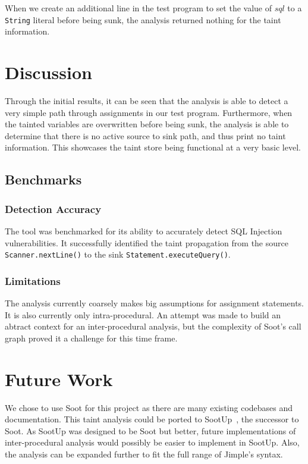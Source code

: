 \documentclass[acmsmall]{acmart}
\begin{document}
When we create an additional line in the test program to set the value of $sql$ to a \texttt{String} literal before being sunk, the analysis returned nothing for the taint information.
\section{Discussion}
Through the initial results, it can be seen that the analysis is able to detect a very simple path through assignments in our test program. Furthermore, when the tainted variables are overwritten before being sunk, the analysis is able to determine that there is no active source to sink path, and thus print no taint information. This showcases the taint store being functional at a very basic level.

\subsection{Benchmarks}
\subsubsection{Detection Accuracy} The tool was benchmarked for its ability to accurately detect SQL Injection vulnerabilities. It successfully identified the taint propagation from the source \texttt{Scanner.nextLine()} to the sink \texttt{Statement.executeQuery()}.

\subsubsection{Limitations}
The analysis currently coarsely makes big assumptions for assignment statements. It is also currently only intra-procedural. An attempt was made to build an abtract context for an inter-procedural analysis, but the complexity of Soot's call graph proved it a challenge for this time frame.

\section{Future Work}
We chose to use Soot for this project as there are many existing codebases and documentation. This taint analysis could be ported to SootUp~\cite{SootUp}, the successor to Soot. As SootUp was designed to be Soot but better, future implementations of inter-procedural analysis would possibly be easier to implement in SootUp. Also, the analysis can be expanded further to fit the full range of Jimple's syntax.


\nocite{LstFormatting}


\end{document}
